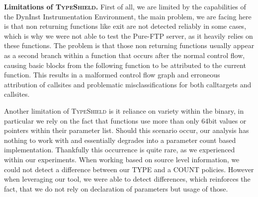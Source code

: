 \textbf{Limitations of \textsc{TypeShield}.}
\label{section:limit}
First of all, we are limited by the capabilities of the DynInst Instrumentation Environment, the main problem,
we are facing here is that non returning functions like exit are not detected reliably in some cases, which is
why we were not able to test the Pure-FTP server, as it heavily relies on these functions. The problem is that
those non returning functions usually appear as a second branch within a function that occurs after the normal
control flow, causing basic blocks from the following function to be attributed to the current function. This
results in a malformed control flow graph and erroneous attribution of callsites and problematic misclassifications
for both calltargets and callsites.

Another limitation of \textsc{TypeShield} is it reliance on variety within the binary, in particular we rely on
the fact that functions use more than only 64bit values or pointers within their parameter list. Should this
scenario occur, our analysis has nothing to work with and essentially degrades into a parameter count based
implementation. Thankfully this occurrence is quite rare, as we experienced within our experiments. When working
based on source level information, we could not detect a difference between our TYPE and a COUNT policies. 
However when leveraging our tool, we were able to detect differences, which reinforces the fact, that we do 
not rely on declaration of parameters but usage of those.
